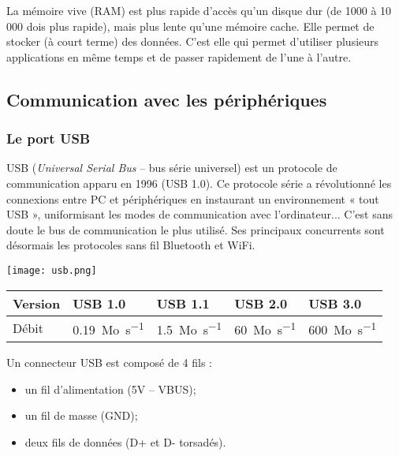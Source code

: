 La mémoire vive (RAM) est plus rapide d'accès qu'un disque dur (de 1000 à 10\, 000 dois plus rapide), mais plus lente qu'une mémoire cache.  Elle permet de stocker (à court terme) des données. C'est elle qui permet d'utiliser plusieurs applications en même temps et de passer rapidement de l'une à l'autre. 



\subsection{Communication avec les périphériques}
\subsubsection{Le port USB \cite{usb}}

\noindent \begin{minipage}[c]{.75\linewidth}
USB (\textit{Universal Serial Bus} -- bus série universel) est un protocole de communication apparu en 1996 (USB 1.0). Ce protocole série a révolutionné les connexions entre PC et périphériques en instaurant un environnement « tout USB », uniformisant les modes de communication avec l'ordinateur... C'est sans doute le bus de communication le plus utilisé. Ses principaux concurrents sont désormais les protocoles sans fil Bluetooth et WiFi.
\end{minipage}\hfill
\begin{minipage}[c]{.2\linewidth}
\begin{center}
\texttt{[image: usb.png]}
\end{center}
\end{minipage}

\begin{center}
\begin{tabular}{|l|l|l|l|l|}
\hline
Version & USB 1.0 & USB 1.1 & USB 2.0 & USB 3.0 \\ \hline
Débit   & \SI{0,19}{Mo.s^{-1}} & \SI{1,5}{Mo.s^{-1}} & \SI{60}{Mo.s^{-1}} & \SI{600}{Mo.s^{-1}}  \\ \hline
\end{tabular}
\end{center}

Un connecteur USB est composé de 4 fils : 
\begin{itemize}
\item un fil d'alimentation (5V -- VBUS);
\item un fil de masse (GND);
\item deux fils de données (D+ et D- torsadés). 
\end{itemize}

